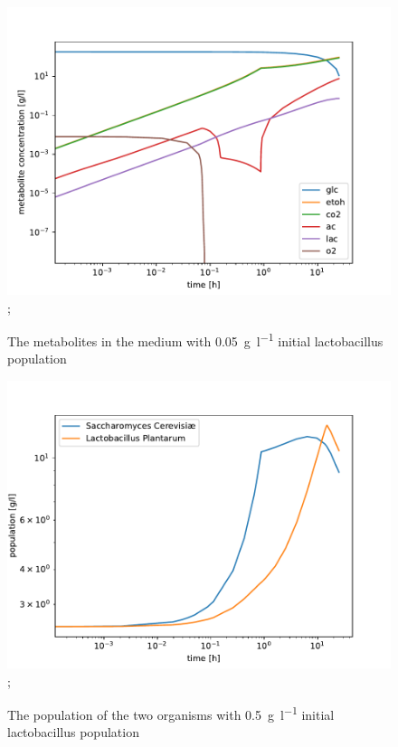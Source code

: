 		\begin{figure}[h]
			\includegraphics[width=\linewidth]{figures/results/cocultures/0.1_metabolites.pdf};
			\caption{The metabolites in the medium with \SI{0.05}{\gram\per\litre} initial lactobacillus population}
			\label{fig:cocult_0.1_met}
		\end{figure}
		
		\begin{figure}[h]
			\includegraphics[width=\linewidth]{figures/results/cocultures/1_populations.pdf};
			\caption{The population of the two organisms with \SI{0.5}{\gram\per\litre} initial lactobacillus population}
			\label{fig:cocult_1_pop}
		\end{figure}
		

